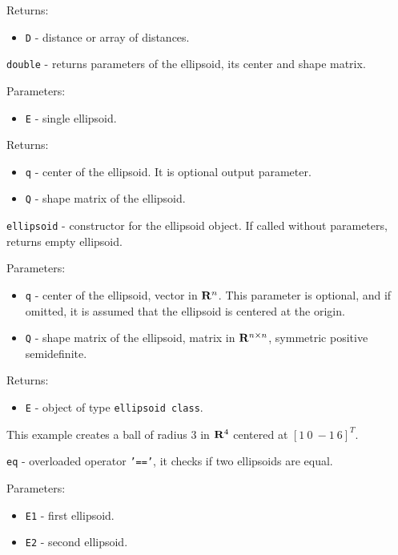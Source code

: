 \documentclass{report}
\begin{document}
Returns:
\begin{itemize}
\item {\tt D} - distance or array of distances.
\end{itemize}



\newpage

{\Large {\tt double}} - returns parameters of the ellipsoid, its center
and shape matrix.

Parameters:
\begin{itemize}
\item {\tt E} - single ellipsoid.
\end{itemize}

Returns:
\begin{itemize}
\item {\tt q} - center of the ellipsoid. It is optional output parameter.
\item {\tt Q} - shape matrix of the ellipsoid.
\end{itemize}

\newpage

{\Large {\tt ellipsoid}} - constructor for the ellipsoid object.
If called without parameters, returns empty ellipsoid.

Parameters:
\begin{itemize}
\item {\tt q} - center of the ellipsoid, vector in ${\bf R}^n$.
This parameter is optional, and if omitted, it is assumed that the ellipsoid
is centered at the origin.
\item {\tt Q} - shape matrix of the ellipsoid, matrix in ${\bf R}^{n\times n}$,
symmetric positive semidefinite.
\end{itemize}
Returns:
\begin{itemize}
\item {\tt E} - object of type {\tt ellipsoid class}.
\end{itemize}

This example creates a ball of radius $3$ in ${\bf R}^4$ centered at $[1 ~ 0 ~ -1 ~ 6]^T$.

\newpage

{\Large {\tt eq}} - overloaded operator {\tt '=='},
it checks if two ellipsoids are equal.

Parameters:
\begin{itemize}
\item {\tt E1} - first ellipsoid.
\item {\tt E2} - second ellipsoid.
\end{itemize}
\end{document}
